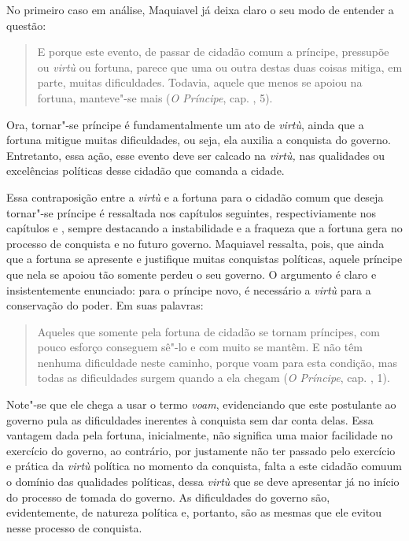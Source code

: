 No primeiro caso em análise, Maquiavel já deixa claro o seu modo de
entender a questão:

\begin{quote}
E porque este evento, de passar de cidadão comum a príncipe,
pressupõe ou \emph{virtù} ou fortuna, parece que uma ou outra destas
duas coisas mitiga, em parte, muitas dificuldades. Todavia, aquele que
menos se apoiou na fortuna, manteve"-se mais (\emph{O Príncipe}, cap. , 5).
\end{quote}

Ora, tornar"-se príncipe é fundamentalmente um ato de \emph{virtù}, ainda
que a fortuna mitigue muitas dificuldades, ou seja, ela auxilia a
conquista do governo. Entretanto, essa ação, esse evento deve ser
calcado na \emph{virtù,} nas qualidades ou excelências políticas desse
cidadão que comanda a cidade.

Essa contraposição entre a \emph{virtù} e a fortuna para o cidadão comum
que deseja tornar"-se príncipe é ressaltada nos capítulos seguintes,
respectiviamente nos capítulos  e , sempre destacando a
instabilidade e a fraqueza que a fortuna gera no processo de conquista e
no futuro governo. Maquiavel ressalta, pois, que ainda que a fortuna se
apresente e justifique muitas conquistas políticas, aquele príncipe que
nela se apoiou tão somente perdeu o seu governo. O argumento é claro e
insistentemente enunciado: para o príncipe novo, é necessário a
\emph{virtù} para a conservação do poder. Em suas palavras:

\begin{quote}
Aqueles que somente pela fortuna de cidadão se tornam
príncipes, com pouco esforço conseguem sê"-lo e com muito se mantêm. E
não têm nenhuma dificuldade neste caminho, porque voam para esta
condição, mas todas as dificuldades surgem quando a ela chegam
(\emph{O Príncipe}, cap. , 1).
\end{quote}

Note"-se que ele chega a usar o termo \emph{voam}, evidenciando que este
postulante ao governo pula as dificuldades inerentes à conquista sem dar
conta delas. Essa vantagem dada pela fortuna, inicialmente, não
significa uma maior facilidade no exercício do governo, ao contrário,
por justamente não ter passado pelo exercício e prática da \emph{virtù}
política no momento da conquista, falta a este cidadão comuum o domínio
das qualidades políticas, dessa \emph{virtù} que se deve apresentar já
no início do processo de tomada do governo. As dificuldades do governo
são, evidentemente, de natureza política e, portanto, são as mesmas que
ele evitou nesse processo de conquista.

